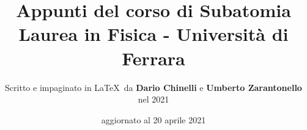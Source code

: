 \documentclass[11pt]{article}
\begin{document}
\title{\textbf{Appunti del corso di Subatomia} \\
Laurea in Fisica - Università di Ferrara} 

\author{Scritto e impaginato in \LaTeX\ da \textbf{Dario Chinelli} e \textbf{Umberto Zarantonello} nel 2021}

\date{aggiornato al 20 aprile 2021}

\maketitle

\newpage

\tableofcontents

\newpage

							





%

%

%






%

%

%



\end{document}
